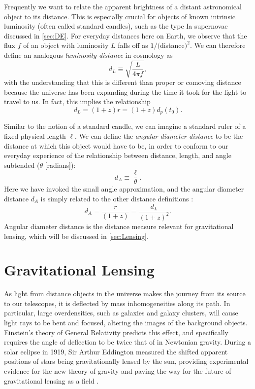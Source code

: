 Frequently we want to relate the apparent brightness of a distant astronomical object to its distance. This is especially crucial for objects of known intrinsic luminosity (often called standard candles), such as the type Ia supernovae discussed in \autoref{sec:DE}. For everyday distances here on Earth, we observe that the flux $f$ of an object with luminosity $L$ falls off as $1/($distance$)^2$. We can therefore define an analogous {\it luminosity distance} in cosmology as
\begin{equation}
d_L \equiv \sqrt{\frac{L}{4\pi f}},
\end{equation}
with the understanding that this is different than proper or comoving distance because the universe has been expanding during the time it took for the light to travel to us. In fact, this implies the relationship
\begin{equation}
d_L = (1+z)r = (1+z)d_p(t_0).
\end{equation}

Similar to the notion of a standard candle, we can imagine a standard ruler of a fixed physical length $\ell$. We can define the {\it angular diameter distance} to be the distance at which this object would have to be, in order to conform to our everyday experience of the relationship between distance, length, and angle subtended ($\theta$ [radians]):
\begin{equation}
d_A \equiv \frac{\ell}{\theta}.
\end{equation}
Here we have invoked the small angle approximation, and the angular diameter distance $d_A$ is simply related to the other distance definitions \citep{RydenText}:
\begin{equation}
d_A = \frac{r}{(1+z)}= \frac{d_L}{(1+z)^2}.
\end{equation}
Angular diameter distance is the distance measure relevant for gravitational lensing, which will be discussed in \autoref{sec:Lensing}.

\section{Gravitational Lensing}
\label{sec:Lensing}

As light from distance objects in the universe makes the journey from its source to our telescopes, it is deflected by mass inhomogeneities along its path. In particular, large overdensities, such as galaxies and galaxy clusters, will cause light rays to be bent and focused, altering the images of the background objects. Einstein's theory of General Relativity predicts this effect, and specifically requires the angle of deflection to be twice that of in Newtonian gravity. During a solar eclipse in 1919, Sir Arthur Eddington measured the shifted apparent positions of stars being gravitationally lensed by the sun, providing experimental evidence for the new theory of gravity and paving the way for the future of gravitational lensing as a field \citep{BS01}.

